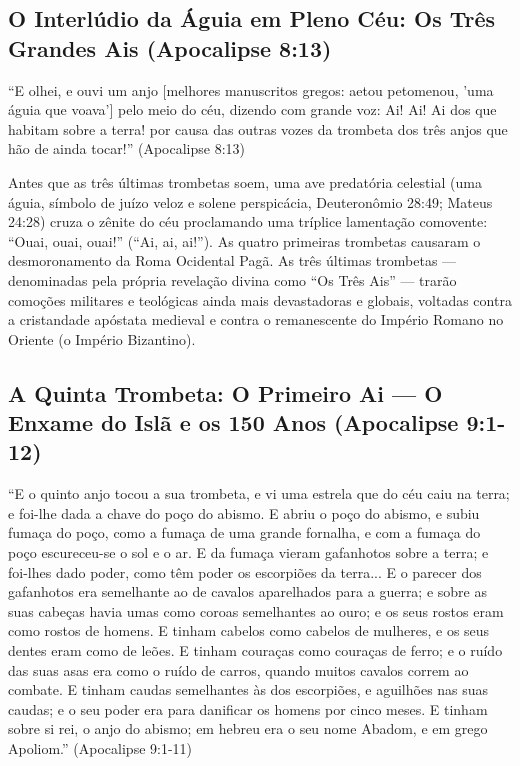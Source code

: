 \documentclass[11pt,a4paper,openany]{book}
\begin{document}
\subsection{O Interlúdio da Águia em Pleno Céu: Os Três Grandes Ais (Apocalipse 8:13)}


``E olhei, e ouvi um anjo [melhores manuscritos gregos: aetou petomenou, 'uma águia que voava'] pelo meio do céu, dizendo com grande voz: Ai! Ai! Ai dos que habitam sobre a terra! por causa das outras vozes da trombeta dos três anjos que hão de ainda tocar!'' (Apocalipse 8:13)

Antes que as três últimas trombetas soem, uma ave predatória celestial (uma águia, símbolo de juízo veloz e solene perspicácia, Deuteronômio 28:49; Mateus 24:28) cruza o zênite do céu proclamando uma tríplice lamentação comovente: ``Ouai, ouai, ouai!'' (``Ai, ai, ai!'').
As quatro primeiras trombetas causaram o desmoronamento da Roma Ocidental Pagã. As três últimas trombetas — denominadas pela própria revelação divina como ``Os Três Ais'' — trarão comoções militares e teológicas ainda mais devastadoras e globais, voltadas contra a cristandade apóstata medieval e contra o remanescente do Império Romano no Oriente (o Império Bizantino).



\subsection{A Quinta Trombeta: O Primeiro Ai — O Enxame do Islã e os 150 Anos (Apocalipse 9:1-12)}


``E o quinto anjo tocou a sua trombeta, e vi uma estrela que do céu caiu na terra; e foi-lhe dada a chave do poço do abismo. E abriu o poço do abismo, e subiu fumaça do poço, como a fumaça de uma grande fornalha, e com a fumaça do poço escureceu-se o sol e o ar. E da fumaça vieram gafanhotos sobre a terra; e foi-lhes dado poder, como têm poder os escorpiões da terra... E o parecer dos gafanhotos era semelhante ao de cavalos aparelhados para a guerra; e sobre as suas cabeças havia umas como coroas semelhantes ao ouro; e os seus rostos eram como rostos de homens. E tinham cabelos como cabelos de mulheres, e os seus dentes eram como de leões. E tinham couraças como couraças de ferro; e o ruído das suas asas era como o ruído de carros, quando muitos cavalos correm ao combate. E tinham caudas semelhantes às dos escorpiões, e aguilhões nas suas caudas; e o seu poder era para danificar os homens por cinco meses. E tinham sobre si rei, o anjo do abismo; em hebreu era o seu nome Abadom, e em grego Apoliom.'' (Apocalipse 9:1-11)
\end{document}

